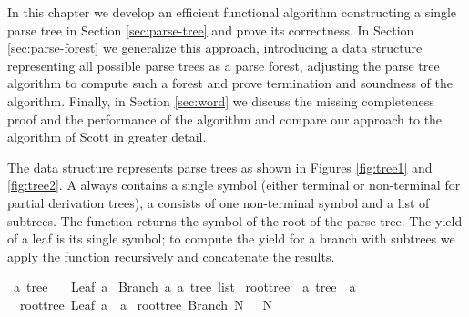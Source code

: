\begin{isabellebody}
\begin{isamarkuptext}
In this chapter we develop an efficient functional algorithm constructing a single parse
tree in Section \ref{sec:parse-tree} and prove its correctness. In Section \ref{sec:parse-forest}
we generalize this approach, introducing a data structure representing all possible parse trees
as a parse forest, adjusting the parse tree algorithm to compute such a forest and prove termination
and soundness of the algorithm. Finally, in Section \ref{sec:word} we discuss the missing
completeness proof and the performance of the algorithm and compare our approach to the algorithm of Scott in greater detail.%
\end{isamarkuptext}\isamarkuptrue%
%
\isadelimdocument
%
\endisadelimdocument
%
\isatagdocument
%
\isamarkuptrue%
%
\endisatagdocument
{\isafolddocument}%
%
\isadelimdocument
%
\endisadelimdocument
%
\begin{isamarkuptext}%
The data structure  represents parse trees as shown in Figures \ref{fig:tree1} and \ref{fig:tree2}.
A  always contains a single symbol (either terminal or non-terminal for partial derivation trees), a  consists of one non-terminal
symbol and a list of subtrees. The function  returns the symbol of the root of the
parse tree. The yield of a leaf is its single symbol; to compute the yield for a branch with
subtrees  we apply the function  recursively and concatenate the results.%
\end{isamarkuptext}\isamarkuptrue%
\isamarkupfalse%
\ {\isacharprime}{\kern0pt}a\ tree\ {\isacharequal}{\kern0pt}\isanewline
\ \ Leaf\ {\isacharprime}{\kern0pt}a\isanewline
{\isacharbar}{\kern0pt}\ Branch\ {\isacharprime}{\kern0pt}a\ {\isachardoublequoteopen}{\isacharprime}{\kern0pt}a\ tree\ list{\isachardoublequoteclose}\isanewline
\isanewline
{}\isamarkupfalse%
\ root{\isacharunderscore}{\kern0pt}tree\ {\isacharcolon}{\kern0pt}{\isacharcolon}{\kern0pt}\ {\isachardoublequoteopen}{\isacharprime}{\kern0pt}a\ tree\ {\isasymRightarrow}\ {\isacharprime}{\kern0pt}a{\isachardoublequoteclose}\ \isanewline
\ \ {\isachardoublequoteopen}root{\isacharunderscore}{\kern0pt}tree\ {\isacharparenleft}{\kern0pt}Leaf\ a{\isacharparenright}{\kern0pt}\ {\isacharequal}{\kern0pt}\ a{\isachardoublequoteclose}\isanewline
{\isacharbar}{\kern0pt}\ {\isachardoublequoteopen}root{\isacharunderscore}{\kern0pt}tree\ {\isacharparenleft}{\kern0pt}Branch\ N\ {\isacharunderscore}{\kern0pt}{\isacharparenright}{\kern0pt}\ {\isacharequal}{\kern0pt}\ N{\isachardoublequoteclose}\isanewline

\end{isabellebody}
